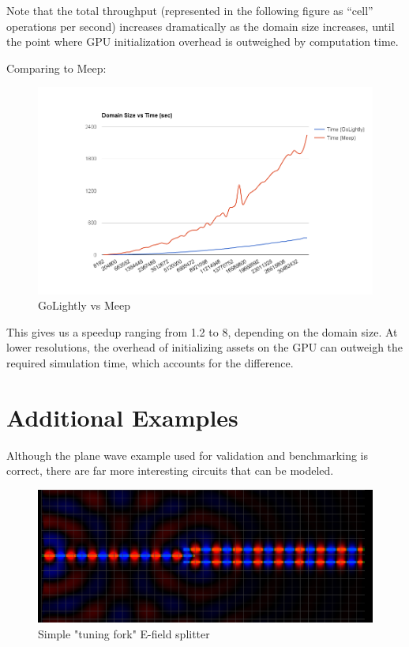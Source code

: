 Note that the total throughput (represented in the following figure as “cell” operations per second) increases dramatically as the domain size increases, until the point where GPU initialization overhead is outweighed by computation time.

Comparing to Meep:

\begin{figure}[H]
	\centering
	\includegraphics[width=\textwidth,
	keepaspectratio]{gpu-vs-meep.png}
	\caption{GoLightly vs Meep}
	\label{fig:gpuVsMeep}
\end{figure}

This gives us a speedup ranging from 1.2 to 8, depending on the domain size. At lower resolutions, the overhead of initializing assets on the GPU can outweigh the required simulation time, which accounts for the difference.

\section{Additional Examples}

Although the plane wave example used for validation and benchmarking is correct, there are far more interesting circuits that can be modeled. 

\begin{figure}[H]
	\centering
	\includegraphics[width=\textwidth,
	keepaspectratio]{example1.png}
	\caption{Simple "tuning fork" E-field splitter}
	\label{fig:example1}
\end{figure}


